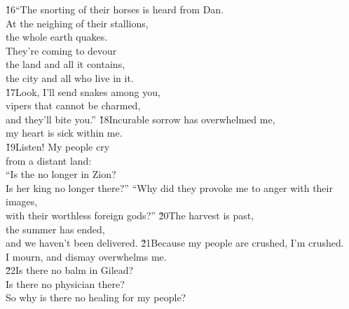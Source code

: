 \begin{poetry}
\poeml \v{16}``The snorting of their horses is heard from Dan. \\
\poemll    At the neighing of their stallions, \\
\poemlll       the whole earth quakes. \\
\poeml They're coming to devour \\
\poemll    the land and all it contains, \\
\poemlll       the city and all who live in it. \\
\poeml \v{17}Look, I'll send snakes among you, \\
\poemll    vipers that cannot be charmed, \\
\poemlll       and they'll bite you.''
\poeml \v{18}Incurable sorrow has overwhelmed me, \\
\poemll    my heart is sick within me. \\
\poeml \v{19}Listen! My people cry \\
\poemll    from a distant land: \\
\poeml ``Is the  no longer in Zion? \\
\poemll    Is her king no longer there?''
\poeml ``Why did they provoke me to anger with their images, \\
\poemll    with their worthless foreign gods?''
\poeml \v{20}The harvest is past, \\
\poemll    the summer has ended, \\
\poemlll       and we haven't been delivered.
\poeml \v{21}Because my people are crushed, I'm crushed. \\
\poemll    I mourn, and dismay overwhelms me. \\
\poeml \v{22}Is there no balm in Gilead? \\
\poemll    Is there no physician there? \\
\poemlll       So why is there no healing for my people?
\end{poetry}

